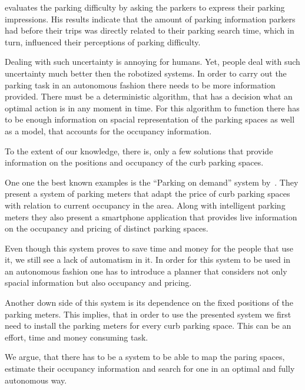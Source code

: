 \citet{rodrigue2013geography} evaluates the parking difficulty by asking the
parkers to express their parking impressions. His results indicate that the
amount of parking information parkers had before their trips was directly
related to their parking search time, which in turn, influenced their
perceptions of parking difficulty.

Dealing with such uncertainty is annoying for humans. Yet, people deal with
such uncertainty much better then the robotized systems. In order to carry out
the parking task in an autonomous fashion there needs to be more information
provided. There must be a deterministic algorithm, that has a decision what an
optimal action is in any moment in time. For this algorithm to function there
has to be enough information on spacial representation of the parking spaces
as well as a model, that accounts for the occupancy information.

To the extent of our knowledge, there is, only a few solutions that provide
information on the positions and occupancy of the curb parking spaces.

One one the best known examples is the ``Parking on demand'' system
by~\citet{sfo,sfo2}. They present a system of parking meters that adapt the
price of curb parking spaces with relation to current occupancy in the area.
Along with intelligent parking meters they also present a smartphone
application that provides live information on the occupancy and pricing of
distinct parking spaces.

Even though this system proves to save time and money for the people that use
it, we still see a lack of automatism in it. In order for this system to be
used in an autonomous fashion one has to introduce a planner that considers
not only spacial information but also occupancy and pricing.

Another down side of this system is its dependence on the fixed positions of
the parking meters. This implies, that in order to use the presented system we
first need to install the parking meters for every curb parking space. This
can be an effort, time and money consuming task.

We argue, that there has to be a system to be able to map the paring spaces,
estimate their occupancy information and search for one in an optimal and
fully autonomous way.

